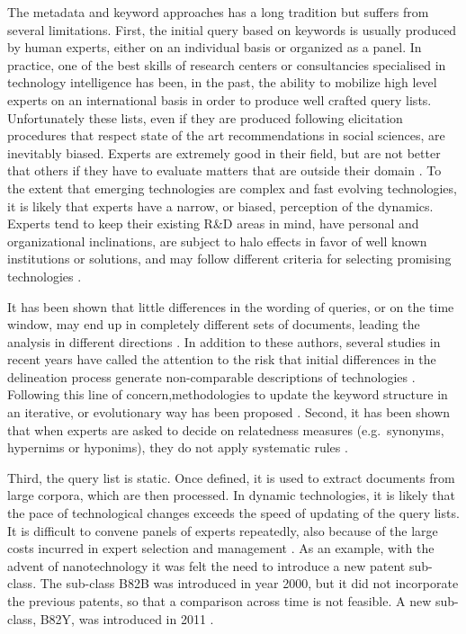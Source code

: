 \documentclass[]{book}
\theoremstyle{definition}
\theoremstyle{definition}
\theoremstyle{definition}
\theoremstyle{remark}
\begin{document}
The metadata and keyword approaches has a long tradition but suffers
from several limitations. First, the initial query based on keywords is
usually produced by human experts, either on an individual basis or
organized as a panel. In practice, one of the best skills of research
centers or consultancies specialised in technology intelligence has
been, in the past, the ability to mobilize high level experts on an
international basis in order to produce well crafted query lists.
Unfortunately these lists, even if they are produced following
elicitation procedures that respect state of the art recommendations in
social sciences, are inevitably biased. Experts are extremely good in
their field, but are not better that others if they have to evaluate
matters that are outside their domain \citep{burgman2015trusting}. To
the extent that emerging technologies are complex and fast evolving
technologies, it is likely that experts have a narrow, or biased,
perception of the dynamics. Experts tend to keep their existing R\&D
areas in mind, have personal and organizational inclinations, are
subject to halo effects in favor of well known institutions or
solutions, and may follow different criteria for selecting promising
technologies \citep{kim2017novel}.

It has been shown that little differences in the wording of queries, or
on the time window, may end up in completely different sets of
documents, leading the analysis in different directions
\citep{bassecoulard2007mapping}. In addition to these authors, several
studies in recent years have called the attention to the risk that
initial differences in the delineation process generate non-comparable
descriptions of technologies
\citep{mogoutov2007data, youtie2008nanotechnology, ghazinoory2013application}.
Following this line of concern,methodologies to update the keyword
structure in an iterative, or evolutionary way has been proposed
\citep{mogoutov2007data}. Second, it has been shown that when experts
are asked to decide on relatedness measures (e.g.~synonyms, hypernims or
hyponims), they do not apply systematic rules
\citep{tseng2007text, noh2015keyword}.

Third, the query list is static. Once defined, it is used to extract
documents from large corpora, which are then processed. In dynamic
technologies, it is likely that the pace of technological changes
exceeds the speed of updating of the query lists. It is difficult to
convene panels of experts repeatedly, also because of the large costs
incurred in expert selection and management \citep{tseng2007text}. As an
example, with the advent of nanotechnology it was felt the need to
introduce a new patent sub-class. The sub-class B82B was introduced in
year 2000, but it did not incorporate the previous patents, so that a
comparison across time is not feasible. A new sub-class, B82Y, was
introduced in 2011 \citep{kreuchauff2017patent}.
\end{document}
